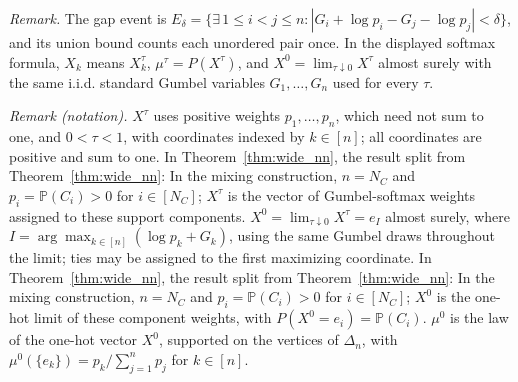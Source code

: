 \noindent\textit{Remark.} The gap event is $E_\delta=\{\exists\,1\leqslant i<j\leqslant n:|G_i+\log p_i-G_j-\log p_j|<\delta\}$, and its union bound counts each unordered pair once. In the displayed softmax formula, $X_k$ means $X_k^\tau$, $\mu^\tau=P(X^\tau)$, and $X^0=\lim_{\tau\downarrow0}X^\tau$ almost surely with the same i.i.d. standard Gumbel variables $G_1,\ldots,G_n$ used for every $\tau$.

\noindent\textit{Remark (notation).} $X^\tau$ uses positive weights $p_1,\ldots,p_n$, which need not sum to one, and $0<\tau<1$, with coordinates indexed by $k\in[n]$; all coordinates are positive and sum to one. In Theorem~\ref{thm:wide_nn}, the result split from Theorem~\ref{thm:wide_nn}: In the mixing construction, $n=N_C$ and $p_i=\mathbb{P}(C_i)>0$ for $i\in[N_C]$; $X^\tau$ is the vector of Gumbel-softmax weights assigned to these support components. $X^0=\lim_{\tau\downarrow0}X^\tau=e_I$ almost surely, where $I=\arg\max_{k\in[n]}(\log p_k+G_k)$, using the same Gumbel draws throughout the limit; ties may be assigned to the first maximizing coordinate. In Theorem~\ref{thm:wide_nn}, the result split from Theorem~\ref{thm:wide_nn}: In the mixing construction, $n=N_C$ and $p_i=\mathbb{P}(C_i)>0$ for $i\in[N_C]$; $X^0$ is the one-hot limit of these component weights, with $P(X^0=e_i)=\mathbb{P}(C_i)$. $\mu^0$ is the law of the one-hot vector $X^0$, supported on the vertices of $\Delta_n$, with $\mu^0(\{e_k\})=p_k/\sum_{j=1}^n p_j$ for $k\in[n]$.


